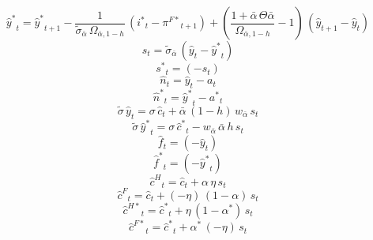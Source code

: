 \begin{dmath}
{{\hat y^*}}_{t}={{\hat y^*}}_{t+1}-\frac{1}{{{\tilde\sigma_{\bar{\alpha}}}}\, {{\Omega_{\bar \alpha,1-h}}}}\, \left({{i^*}}_{t}-{{\pi^{F*}}}_{t+1}\right)+\left(\frac{1+{{\bar{\alpha}}}\, {{\Theta{\bar{\alpha}}}}}{{{\Omega_{\bar \alpha,1-h}}}}-1\right)\, \left({{\hat y}}_{t+1}-{{\hat y}}_{t}\right)
\end{dmath}
\begin{dmath}
{{s}}_{t}={{\tilde\sigma_{\bar{\alpha}}}}\, \left({{\hat y}}_{t}-{{\hat y^*}}_{t}\right)
\end{dmath}
\begin{dmath}
{{s^*}}_{t}=\left(-{{s}}_{t}\right)
\end{dmath}
\begin{dmath}
{{\hat n}}_{t}={{\hat y}}_{t}-{{a}}_{t}
\end{dmath}
\begin{dmath}
{{\hat n^*}}_{t}={{\hat y^*}}_{t}-{{a^*}}_{t}
\end{dmath}
\begin{dmath}
{{\tilde{\sigma}}}\, {{\hat y}}_{t}={{\sigma}}\, {{\hat c}}_{t}+{{\bar{\alpha}}}\, \left(1-{{h}}\right)\, {{w_{\bar{\alpha}}}}\, {{s}}_{t}
\end{dmath}
\begin{dmath}
{{\tilde{\sigma}}}\, {{\hat y^*}}_{t}={{\sigma}}\, {{\hat c^*}}_{t}-{{w_{\bar{\alpha}}}}\, {{\bar{\alpha}}}\, {{h}}\, {{s}}_{t}
\end{dmath}
\begin{dmath}
{{\hat f}}_{t}=\left(-{{\hat y}}_{t}\right)
\end{dmath}
\begin{dmath}
{{\hat f^*}}_{t}=\left(-{{\hat y^*}}_{t}\right)
\end{dmath}
\begin{dmath}
{{\hat c^H}}_{t}={{\hat c}}_{t}+{{\alpha}}\, {{\eta}}\, {{s}}_{t}
\end{dmath}
\begin{dmath}
{{\hat c^F}}_{t}={{\hat c}}_{t}+\left(-{{\eta}}\right)\, \left(1-{{\alpha}}\right)\, {{s}}_{t}
\end{dmath}
\begin{dmath}
{{\hat c^{H*}}}_{t}={{\hat c^*}}_{t}+{{\eta}}\, \left(1-{{\alpha^*}}\right)\, {{s}}_{t}
\end{dmath}
\begin{dmath}
{{\hat c^{F*}}}_{t}={{\hat c^*}}_{t}+{{\alpha^*}}\, \left(-{{\eta}}\right)\, {{s}}_{t}
\end{dmath}

